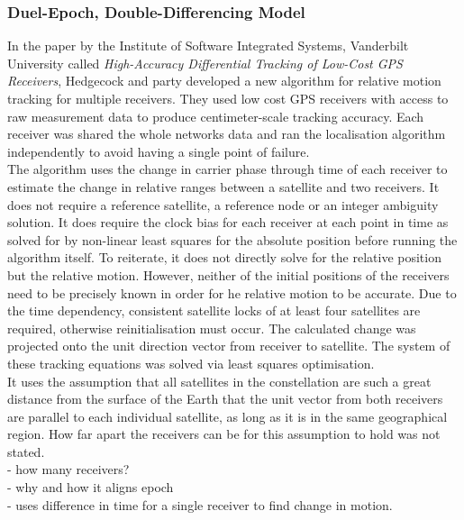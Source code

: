 \documentclass[11pt,a4paper]{article}
\begin{document}
\subsubsection{Duel-Epoch, Double-Differencing Model} \label{DEDD}
In the paper by the Institute of Software Integrated Systems, Vanderbilt University called \textit{High-Accuracy Differential Tracking of Low-Cost GPS Receivers}, Hedgecock and party developed a new algorithm for relative motion tracking for multiple receivers. They used low cost GPS receivers with access to raw measurement data to produce centimeter-scale tracking accuracy. Each receiver was shared the whole networks data and ran the localisation algorithm independently to avoid having a single point of failure.\\

The algorithm uses the change in carrier phase through time of each receiver to estimate the change in relative ranges between a satellite and two receivers. It does not require a reference satellite, a reference node or an integer ambiguity solution. It does require the clock bias for each receiver at each point in time as solved for by non-linear least squares for the absolute position before running the algorithm itself. To reiterate, it does not directly solve for the relative position but the relative motion. However, neither of the initial positions of the receivers need to be precisely known in order for he relative motion to be accurate. Due to the time dependency, consistent satellite locks of at least four satellites are required, otherwise reinitialisation must occur. The calculated change was projected onto the unit direction vector from receiver to satellite. The system of these tracking equations was solved via least squares optimisation. \\

It uses the assumption that all satellites in the constellation are such a great distance from the surface of the Earth that the unit vector from both receivers are parallel to each individual satellite, as long as it is in the same geographical region. How far apart the receivers can be for this assumption to hold was not stated.\\ 




- how many receivers?\\
- why and how it aligns epoch\\
- uses difference in time for a single receiver to find change in motion.
\end{document}
